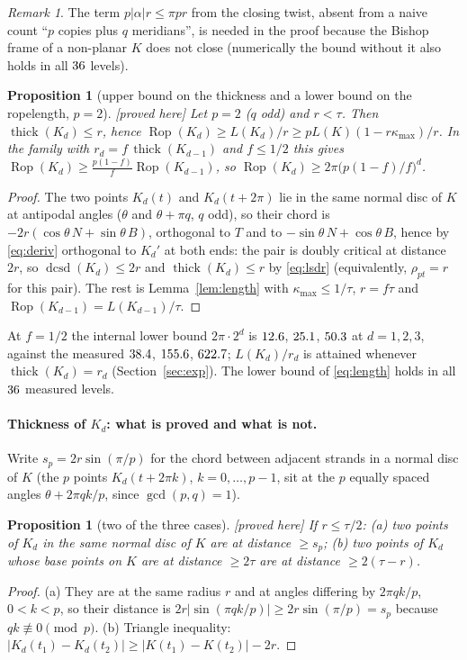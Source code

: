 \documentclass[10pt,a4paper]{article}
\theoremstyle{plain}
\newtheorem{proposition}[theorem]{Proposition}
\theoremstyle{definition}
\theoremstyle{remark}
\newtheorem{remark}[theorem]{Remark}
\newcommand{\thick}{\operatorname{thick}}
\newcommand{\Rop}{\operatorname{Rop}}
\newcommand{\dcsd}{\operatorname{dcsd}}
\newcommand{\status}[1]{\textsf{\small [#1]}}
\begin{document}
\begin{remark}
The term $p|\alpha|r\le\pi pr$ from the closing twist, absent from a naive count ``$p$ copies plus $q$ meridians'', is needed in the proof because the Bishop frame of a non-planar $K$ does not close (numerically the bound without it also holds in all $36$ levels).
\end{remark}

\begin{proposition}[upper bound on the thickness and a lower bound on the ropelength, $p=2$]\label{prop:upper}\status{proved here}
Let $p=2$ ($q$ odd) and $r<\tau$. Then $\thick(K_d)\le r$, hence $\Rop(K_d)\ge L(K_d)/r\ge pL(K)(1-r\kappa_{\max})/r$. In the family with $r_d=f\,\thick(K_{d-1})$ and $f\le1/2$ this gives $\Rop(K_d)\ge\frac{p(1-f)}{f}\Rop(K_{d-1})$, so $\Rop(K_d)\ge2\pi\bigl(p(1-f)/f\bigr)^d$.
\end{proposition}
\begin{proof}
The two points $K_d(t)$ and $K_d(t+2\pi)$ lie in the same normal disc of $K$ at antipodal angles ($\theta$ and $\theta+\pi q$, $q$ odd), so their chord is $-2r(\cos\theta\,N+\sin\theta\,B)$, orthogonal to $T$ and to $-\sin\theta\,N+\cos\theta\,B$, hence by \eqref{eq:deriv} orthogonal to $K_d'$ at both ends: the pair is doubly critical at distance $2r$, so $\dcsd(K_d)\le2r$ and $\thick(K_d)\le r$ by \eqref{eq:lsdr} (equivalently, $\rho_{pt}=r$ for this pair). The rest is Lemma~\ref{lem:length} with $\kappa_{\max}\le1/\tau$, $r=f\tau$ and $\Rop(K_{d-1})=L(K_{d-1})/\tau$.
\end{proof}

At $f=1/2$ the internal lower bound $2\pi\cdot2^d$ is $12.6$, $25.1$, $50.3$ at $d=1,2,3$, against the measured $38.4$, $155.6$, $622.7$; $L(K_d)/r_d$ is attained whenever $\thick(K_d)=r_d$ (Section~\ref{sec:exp}). The lower bound of \eqref{eq:length} holds in all $36$ measured levels.

\paragraph{Thickness of $K_d$: what is proved and what is not.} Write $s_p=2r\sin(\pi/p)$ for the chord between adjacent strands in a normal disc of $K$ (the $p$ points $K_d(t+2\pi k)$, $k=0,\dots,p-1$, sit at the $p$ equally spaced angles $\theta+2\pi qk/p$, since $\gcd(p,q)=1$).

\begin{proposition}[two of the three cases]\label{prop:partial}\status{proved here}
If $r\le\tau/2$: (a) two points of $K_d$ in the same normal disc of $K$ are at distance $\ge s_p$; (b) two points of $K_d$ whose base points on $K$ are at distance $\ge2\tau$ are at distance $\ge2(\tau-r)$.
\end{proposition}
\begin{proof}
(a) They are at the same radius $r$ and at angles differing by $2\pi qk/p$, $0<k<p$, so their distance is $2r|\sin(\pi qk/p)|\ge2r\sin(\pi/p)=s_p$ because $qk\not\equiv0\pmod p$. (b) Triangle inequality: $|K_d(t_1)-K_d(t_2)|\ge|K(t_1)-K(t_2)|-2r$.
\end{proof}
\end{document}
